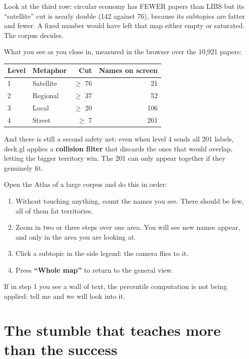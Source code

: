 \documentclass[11pt,a4paper]{article}
\begin{document}
Look at the third row: circular economy has FEWER papers than LIBS but its ``satellite'' cut is
nearly double (142 against 76), because its subtopics are fatter and fewer. A fixed number would
have left that map either empty or saturated. The corpus decides.

What you see as you close in, measured in the browser over the 10,921 papers:

\begin{center}
\begin{tabular}{llrr}
\hline
Level & Metaphor & Cut & Names on screen \\
\hline
1 & Satellite & $\geq$ 76 & 21 \\
2 & Regional  & $\geq$ 37 & 52 \\
3 & Local     & $\geq$ 20 & 106 \\
4 & Street    & $\geq$ 7  & 201 \\
\hline
\end{tabular}
\end{center}

And there is still a second safety net: even when level 4 sends all 201 labels, deck.gl applies
a \textbf{collision filter} that discards the ones that would overlap, letting the bigger
territory win. The 201 can only appear together if they genuinely fit.

\begin{practica}
Open the Atlas of a large corpus and do this in order:
\begin{enumerate}
  \item Without touching anything, count the names you see. There should be few, all of them
        fat territories.
  \item Zoom in two or three steps over one area. You will see new names appear, and only in
        the area you are looking at.
  \item Click a subtopic in the side legend: the camera flies to it.
  \item Press \textbf{``Whole map''} to return to the general view.
\end{enumerate}
If in step 1 you see a wall of text, the percentile computation is not being applied: tell me
and we will look into it.
\end{practica}

\section{The stumble that teaches more than the success}
\end{document}
